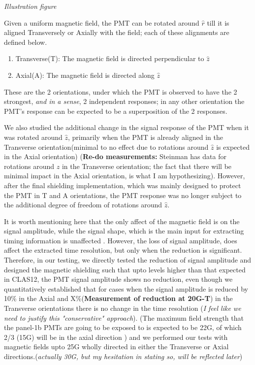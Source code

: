 \documentclass[12pt]{article}
\begin{document}
\textit{Illustration figure}

Given a uniform magnetic field, the PMT can be rotated around $\hat{r}$ till it is aligned Transversely or Axially with the field; each of these alignments are defined below.

\begin{enumerate}
	\item Transverse(T): The magnetic field is directed perpendicular to $\hat{z}$
	\item Axial(A): The magnetic field is directed along $\hat{z}$
\end{enumerate}

These are the 2 orientations, under which the PMT is observed to have the 2 strongest, \textit{and in a sense}, 2 independent responses; in any other orientation the PMT's response can be expected to be a superposition of the 2 responses. 

We also studied the additional change in the signal response of the PMT when it was rotated around $\hat{z}$, primarily when the PMT is already aligned in the Transverse orientation(minimal to no effect due to rotations around $\hat{z}$ is expected in the Axial orientation) \cite{Steinman} (\textbf{Re-do measurements:} Steinman has data for rotations around $\hat{z}$ in the Transverse orientation; the fact that there will be minimal impact in the Axial orientation, is what I am hypothesizing). However, after the final shielding implementation, which was mainly designed to protect the PMT in T and A orientations, the PMT response was no longer subject to the additional degree of freedom of rotations around $\hat{z}$.

It is worth mentioning here that the only affect of the magnetic field is on the signal amplitude, while the signal shape, which is the main input for extracting timing information is unaffected \cite{Steinman}. However, the loss of signal amplitude, does affect the extracted time resolution, but only when the reduction is significant. Therefore, in our testing, we directly tested the reduction of signal amplitude and designed the magnetic shielding such that upto levels higher than that expected in CLAS12, the PMT signal amplitude shows no reduction, even though we quantitatively established that for cases when the signal amplitude is reduced by 10\% in the Axial and X\%(\textbf{Measurement of reduction at 20G-T}) in the Transverse orientations there is no change in the time resolution \cite{Steinman}(\textit{I feel like we need to justify this "conservative" approach}). (The maximum field strength that the panel-1b PMTs are going to be exposed to is expected to be 22G, of which 2/3 (15G) will be in the axial direction \cite{CLAS12FTOFstudies}) and we performed our tests with magnetic fields upto 25G wholly directed in either the Transverse or Axial directions.(\textit{actually 30G, but my hesitation in stating so, will be reflected later})
\end{document}
